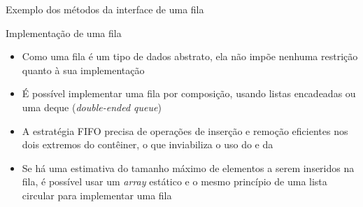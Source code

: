 \begin{frame}[fragile]{Exemplo dos métodos da interface de uma fila}


\end{frame}

\begin{frame}[fragile]{Implementação de uma fila}

    \begin{itemize}
        \item Como uma fila é um tipo de dados abstrato, ela não impõe nenhuma restrição
            quanto à sua implementação

        \item É possível implementar uma fila por composição, usando listas encadeadas ou uma
            deque (\textit{double-ended queue})

        \item A estratégia FIFO precisa de operações de inserção e remoção eficientes nos
            dois extremos do contêiner, o que inviabiliza o uso do  e da

        \item Se há uma estimativa do tamanho máximo de elementos a serem inseridos na fila,
            é possível usar um \textit{array} estático e o mesmo princípio de uma lista circular 
            para implementar uma fila
    \end{itemize}

\end{frame}

